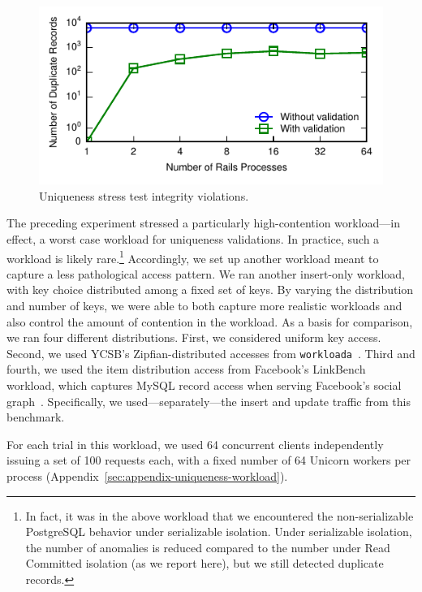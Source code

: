 \begin{figure}\vspace{-1em}
\includegraphics[width=\columnwidth]{figs/pk_stress_violations.pdf}\vspace{-1.5em}
\caption{Uniqueness stress test integrity violations.}\vspace{-.5em}
\label{fig:pk-stress}
\end{figure} 

 The preceding experiment stressed a
particularly high-contention workload---in effect, a worst case
workload for uniqueness validations. In practice, such a workload is
likely rare.\footnote{In fact, it was in the above workload that we
  encountered the non-serializable PostgreSQL behavior under
  serializable isolation. Under serializable isolation, the number of
  anomalies is reduced compared to the number under Read Committed
  isolation (as we report here), but we still detected duplicate
  records.} Accordingly, we set up another workload meant to capture a
less pathological access pattern. We ran another insert-only workload,
with key choice distributed among a fixed set of keys. By varying the
distribution and number of keys, we were able to both capture more
realistic workloads and also control the amount of contention in the
workload. As a basis for comparison, we ran four different
distributions. First, we considered uniform key access. Second, we
used YCSB's Zipfian-distributed accesses from
\texttt{workloada}~\cite{ycsb}. Third and fourth, we used the item
distribution access from Facebook's LinkBench workload, which captures
MySQL record access when serving Facebook's social
graph~\cite{linkbench}. Specifically, we used---separately---the
insert and update traffic from this benchmark.

For each trial in this workload, we used 64 concurrent clients
independently issuing a set of 100 requests each, with a fixed number
of 64 Unicorn workers per process (Appendix~\ref{sec:appendix-uniqueness-workload}). 

